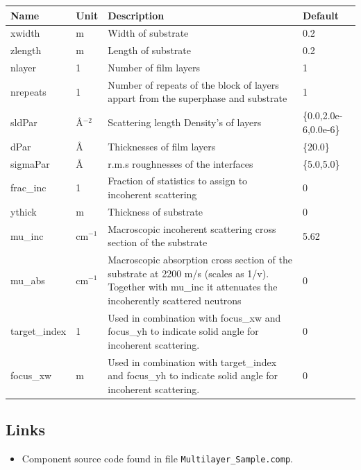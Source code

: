 \begin{longtable}{p{}p{}p{}p{}}
\toprule
\textbf{Name} & \textbf{Unit} & \textbf{Description} & \textbf{Default} \\
\midrule
\endhead
xwidth & m & Width of substrate & 0.2 \\
zlength & m & Length of substrate & 0.2 \\
nlayer & 1 & Number of film layers & 1 \\
nrepeats & 1 & Number of repeats of the block of layers appart from the superphase and substrate & 1 \\
sldPar & \AA{}$^{-2}$ & Scattering length Density's of layers & \{0.0,2.0e-6,0.0e-6\} \\
dPar & \AA{} & Thicknesses of film layers & \{20.0\} \\
sigmaPar & \AA{} & r.m.s roughnesses of the interfaces & \{5.0,5.0\} \\
frac\_inc & 1 & Fraction of statistics to assign to incoherent scattering & 0 \\
ythick & m & Thickness of substrate & 0 \\
mu\_inc & cm$^{-1}$ & Macroscopic incoherent scattering cross section of the substrate & 5.62 \\
mu\_abs & cm$^{-1}$ & Macroscopic absorption cross section of the substrate at 2200 m/s (scales as 1/v). Together with mu\_inc it attenuates the incoherently scattered neutrons & 0 \\
target\_index & 1 & Used in combination with focus\_xw and focus\_yh to indicate solid angle for incoherent scattering. & 0 \\
focus\_xw & m & Used in combination with target\_index and focus\_yh to indicate solid angle for incoherent scattering. & 0 \\
\bottomrule
\end{longtable}

\subsection*{Links}
\begin{itemize}
  \item Component source code found in file \texttt{Multilayer\_Sample.comp}.
\end{itemize}

